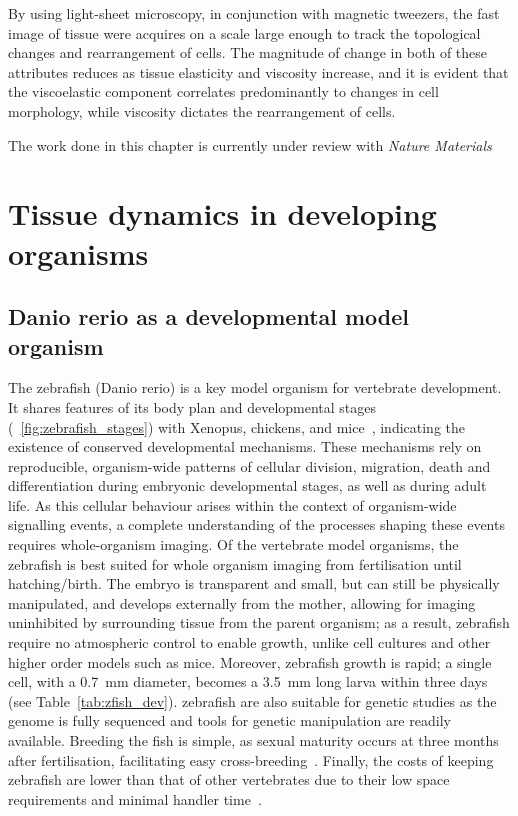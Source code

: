 By using light-sheet microscopy, in conjunction with magnetic tweezers, the fast image of tissue were acquires on a scale large enough to track the topological changes and rearrangement of cells.
The magnitude of change in both of these attributes reduces as tissue elasticity and viscosity increase, and it is evident that the viscoelastic component correlates predominantly to changes in cell morphology, while viscosity dictates the rearrangement of cells.

The work done in this chapter is currently under review with \emph{Nature Materials}
\clearpage

\section{Tissue dynamics in developing organisms}

\subsection{Danio rerio as a developmental model organism}
The \gls{zebrafish} (Danio rerio) is a key model organism for vertebrate development.
It shares features of its body plan and developmental stages (\figurename~\ref{fig:zebrafish_stages}) with Xenopus, chickens, and mice~\cite{wolpertPrinciplesDevelopment2006}, indicating the existence of conserved developmental mechanisms.
These mechanisms rely on reproducible, organism-wide patterns of cellular division, migration, death and differentiation during embryonic developmental stages, as well as during adult life.
As this cellular behaviour arises within the context of organism-wide signalling events, a complete understanding of the processes shaping these events requires whole-organism imaging.
Of the vertebrate model organisms, the \gls{zebrafish} is best suited for whole organism imaging from fertilisation until hatching/birth.
The embryo is transparent and small, but can still be physically manipulated, and develops externally from the mother, allowing for imaging uninhibited by surrounding tissue from the parent organism; as a result, \gls{zebrafish} require no atmospheric control to enable growth, unlike cell cultures and other higher order models such as mice.
Moreover, \gls{zebrafish} growth is rapid; a single cell, with a \SI{0.7}{\milli\meter} diameter, becomes a \SI{3.5}{\milli\meter} long larva within three days (see Table~\ref{tab:zfish_dev}).
\gls{zebrafish} are also suitable for genetic studies as the genome is fully sequenced and tools for genetic manipulation are readily available.
Breeding the fish is simple, as sexual maturity occurs at three months after fertilisation, facilitating easy cross-breeding~\cite{kimmelStagesEmbryonicDevelopment1995}.
Finally, the costs of keeping \gls{zebrafish} are lower than that of other vertebrates due to their low space requirements and minimal handler time~\cite{AnimalModelsHuman}.

